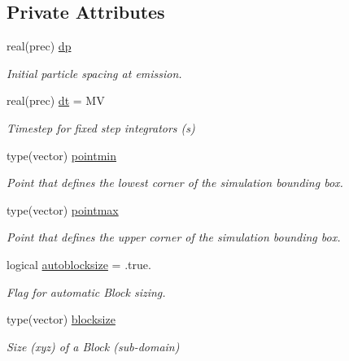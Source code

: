 \subsection*{Private Attributes}
\begin{DoxyCompactItemize}
\item 
real(prec) \mbox{\hyperlink{structsimulationglobals__mod_1_1simdefs__t_a27deca8939ad1f57e66c138800690505}{dp}}
\begin{DoxyCompactList}\small\item\em Initial particle spacing at emission. \end{DoxyCompactList}\item 
real(prec) \mbox{\hyperlink{structsimulationglobals__mod_1_1simdefs__t_a3893522d33efbdcb47d81ed1963a228c}{dt}} = MV
\begin{DoxyCompactList}\small\item\em Timestep for fixed step integrators (s) \end{DoxyCompactList}\item 
type(vector) \mbox{\hyperlink{structsimulationglobals__mod_1_1simdefs__t_ac4fc53f104e7620ef7f0384382dcc1a2}{pointmin}}
\begin{DoxyCompactList}\small\item\em Point that defines the lowest corner of the simulation bounding box. \end{DoxyCompactList}\item 
type(vector) \mbox{\hyperlink{structsimulationglobals__mod_1_1simdefs__t_ac6f91911424ae7c225e583c546283d2d}{pointmax}}
\begin{DoxyCompactList}\small\item\em Point that defines the upper corner of the simulation bounding box. \end{DoxyCompactList}\item 
logical \mbox{\hyperlink{structsimulationglobals__mod_1_1simdefs__t_afe52beb1868355418e312ffb9ef8f0ad}{autoblocksize}} = .true.
\begin{DoxyCompactList}\small\item\em Flag for automatic Block sizing. \end{DoxyCompactList}\item 
type(vector) \mbox{\hyperlink{structsimulationglobals__mod_1_1simdefs__t_a163dc34a434aec7372dcad90b48ab0ed}{blocksize}}
\begin{DoxyCompactList}\small\item\em Size (xyz) of a Block (sub-\/domain) \end{DoxyCompactList}\item 

\end{DoxyCompactItemize}
